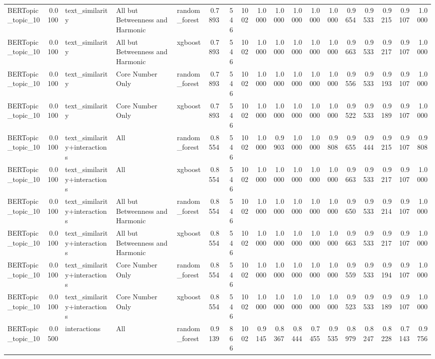 \begin{tabular}{lrlllrrrrrrrrrrrrr}
BERTopic_topic_10 & 0.0100 & text_similarity & All but Betweenness and Harmonic & random_forest & 0.7893 & 546 & 1002 & 1.0000 & 1.0000 & 1.0000 & 1.0000 & 1.0000 & 0.9654 & 0.9533 & 0.9215 & 0.9107 & 1.0000 \\
BERTopic_topic_10 & 0.0100 & text_similarity & All but Betweenness and Harmonic & xgboost & 0.7893 & 546 & 1002 & 1.0000 & 1.0000 & 1.0000 & 1.0000 & 1.0000 & 0.9663 & 0.9533 & 0.9217 & 0.9107 & 1.0000 \\
BERTopic_topic_10 & 0.0100 & text_similarity & Core Number Only & random_forest & 0.7893 & 546 & 1002 & 1.0000 & 1.0000 & 1.0000 & 1.0000 & 1.0000 & 0.9556 & 0.9533 & 0.9193 & 0.9107 & 1.0000 \\
BERTopic_topic_10 & 0.0100 & text_similarity & Core Number Only & xgboost & 0.7893 & 546 & 1002 & 1.0000 & 1.0000 & 1.0000 & 1.0000 & 1.0000 & 0.9522 & 0.9533 & 0.9189 & 0.9107 & 1.0000 \\
BERTopic_topic_10 & 0.0100 & text_similarity+interactions & All & random_forest & 0.8554 & 546 & 1002 & 1.0000 & 0.9903 & 1.0000 & 1.0000 & 0.9808 & 0.9655 & 0.9444 & 0.9215 & 0.9107 & 0.9808 \\
BERTopic_topic_10 & 0.0100 & text_similarity+interactions & All & xgboost & 0.8554 & 546 & 1002 & 1.0000 & 1.0000 & 1.0000 & 1.0000 & 1.0000 & 0.9663 & 0.9533 & 0.9217 & 0.9107 & 1.0000 \\
BERTopic_topic_10 & 0.0100 & text_similarity+interactions & All but Betweenness and Harmonic & random_forest & 0.8554 & 546 & 1002 & 1.0000 & 1.0000 & 1.0000 & 1.0000 & 1.0000 & 0.9650 & 0.9533 & 0.9214 & 0.9107 & 1.0000 \\
BERTopic_topic_10 & 0.0100 & text_similarity+interactions & All but Betweenness and Harmonic & xgboost & 0.8554 & 546 & 1002 & 1.0000 & 1.0000 & 1.0000 & 1.0000 & 1.0000 & 0.9663 & 0.9533 & 0.9217 & 0.9107 & 1.0000 \\
BERTopic_topic_10 & 0.0100 & text_similarity+interactions & Core Number Only & random_forest & 0.8554 & 546 & 1002 & 1.0000 & 1.0000 & 1.0000 & 1.0000 & 1.0000 & 0.9559 & 0.9533 & 0.9194 & 0.9107 & 1.0000 \\
BERTopic_topic_10 & 0.0100 & text_similarity+interactions & Core Number Only & xgboost & 0.8554 & 546 & 1002 & 1.0000 & 1.0000 & 1.0000 & 1.0000 & 1.0000 & 0.9523 & 0.9533 & 0.9189 & 0.9107 & 1.0000 \\
BERTopic_topic_10 & 0.0500 & interactions & All & random_forest & 0.9139 & 866 & 1002 & 0.9145 & 0.8367 & 0.8444 & 0.7455 & 0.9535 & 0.8979 & 0.8247 & 0.8228 & 0.7143 & 0.9756 \\

\end{tabular}
